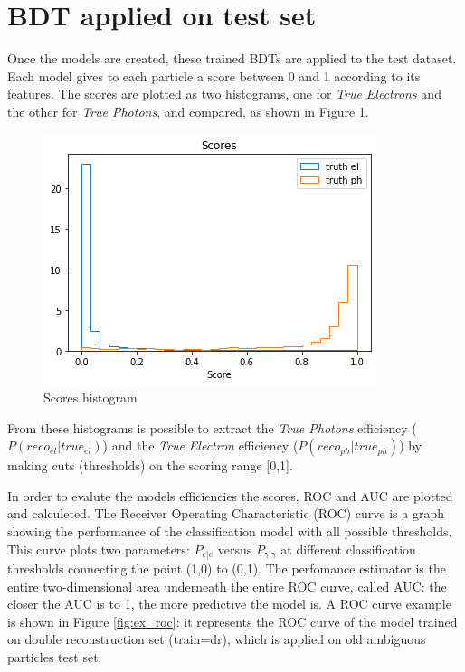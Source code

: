 \documentclass[a4paper, oneside, 11pt, openright]{book}
\begin{document}
			
			
		\section{BDT applied on test set}
			Once the models are created, these trained BDTs are applied to the test dataset. Each model gives to each particle a score between 0 and 1 according to its features. %
			The scores are plotted as two histograms, one for \textit{True Electrons} and the other for \textit{True Photons}, and compared, as shown in Figure \ref{fig:scores}.
		    \begin{figure}[h!]
		    	\centering
		    	\includegraphics[width=.6\linewidth]{tesi_images/scores.png} 
		    	\caption{Scores histogram} 
		    	\label{fig:scores}
		    \end{figure}
		    
		    From these histograms is possible to extract the \textit{True Photons} efficiency ($P(reco_{el}|true_{el})$)
			and the \textit{True Electron} efficiency ($P(reco_{ph}|true_{ph})$)
			by making cuts (thresholds) on the scoring range [0,1].
			
			In order to evalute the models efficiencies the scores, ROC and AUC are plotted and calculeted.
			The Receiver Operating Characteristic (ROC) curve is a graph showing the performance of the  classification model with all possible thresholds. This curve plots two parameters: $P_{e|e}$ versus $P_{\gamma|\gamma}$ at different classification thresholds connecting the point (1,0) to (0,1). The perfomance estimator is the entire two-dimensional area underneath the entire ROC curve, called AUC: the closer the AUC is to 1, the more predictive the model is. A ROC curve example is shown in Figure \ref{fig:ex_roc}: it represents the ROC curve of the model trained on double reconstruction set (train=dr), which is applied on old ambiguous particles test set.
			
\end{document}
